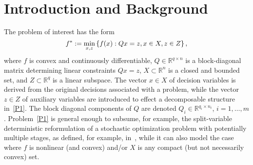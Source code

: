 \section{Introduction and Background}
The problem of interest has the form
\begin{equation}\label{P1}
f^*:=\min_{x,z} \left\{ f(x) : Qx=z, x \in X, z \in Z \right \},
\end{equation}
where $f$ is convex and continuously differentiable, $Q \in \mathbb{R}^{q \times n}$ is a block-diagonal matrix determining linear constraints $Qx=z$, $X\subset \mathbb{R}^n$ is a closed and bounded set, and $Z\subset \mathbb{R}^q$ is a linear subspace. The vector $x \in X$ of decision variables  is derived from the original decisions associated with a problem, while the vector $z \in Z$ of auxiliary variables are introduced to effect a decomposable structure in~\eqref{P1}. The block diagonal components of $Q$ are denoted $Q_i \in \mathbb{R}^{q_i \times n_i}$, $i=1,\dots,m$.
Problem~\eqref{P1} is general enough to subsume, for example, the split-variable deterministic reformulation of a stochastic optimization problem with potentially multiple stages, as defined, for example, in~\cite{BirgeLouveaux2011}, while it can also model the case where $f$ is nonlinear (and convex) and/or $X$ is any compact (but not necessarily convex) set.

